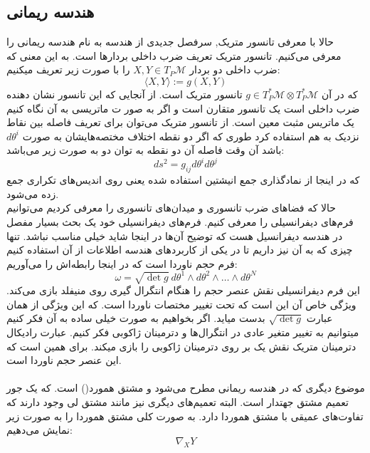 \subsection{هندسه ریمانی}
حالا با معرفی تانسور متریک, سرفصل جدیدی از هندسه به نام هندسه ریمانی را معرفی می‌کنیم. تانسور متریک تعریف ضرب داخلی بردارها است. به این معنی که ضرب داخلی دو بردار $X,Y\in T_P\mathcal{M}$ را با صورت زیر تعریف میکنیم:
\begin{equation}
    \langle X,Y\rangle :=g(X,Y)
\end{equation}
که در آن $g\in T_P^*\mathcal{M}\otimes T_P^*\mathcal{M}$ تانسور متریک است. از آنجایی که این تانسور نشان دهنده ضرب داخلی است یک تانسور متقارن است و اگر به صور ت ماتریسی به آن نگاه کنیم یک ماتریس مثبت معین است. از تانسور متریک می‌توان برای تعریف فاصله بین نقاط نزدیک به هم استفاده کرد طوری که اگر دو نقطه اختلاف مختصه‌هایشان به صورت $d\theta^i$ باشد آن وقت فاصله آن دو نقطه به توان دو به صورت زیر می‌باشد:
\begin{equation}
    ds^2=g_{ij}d\theta^id\theta^j
\end{equation}
که در اینجا از نمادگذاری جمع انیشتین استفاده شده یعنی روی اندیس‌های تکراری جمع زده می‌شود.\\
حالا که فضاهای ضرب تانسوری و میدان‌های تانسوری را معرفی کردیم می‌توانیم فرم‌های دیفرانسیلی را معرفی کنیم. فرم‌های دیفرانسیلی خود یک بحث بسیار مفصل در هندسه دیفرانسیل هست که توضیح آن‌ها در اینجا شاید خیلی مناسب نباشد. تنها چیزی که به آن نیز داریم تا در یکی از کاربردهای هندسه اطلاعات از آن استفاده کنیم فرم حجم ناوردا است که در اینجا رابطه‌اش را می‌آوریم:
\begin{equation}
    \omega=\sqrt{\det g}\ d\theta^1\wedge d\theta^2\wedge \dots \wedge d\theta^N
\end{equation}
این فرم دیفرانسیلی نقش عنصر حجم را هنگام انتگرال گیری روی منیفلد بازی می‌کند. ویژگی خاص آن این است که تحت تغییر مختصات ناوردا است. که این ویژگی از همان عبارت $\sqrt{\det g}$ بدست میاید. اگر بخواهیم به صورت خیلی ساده به آن فکر کنیم میتوانیم به تغییر متغیر عادی در انتگرال‌ها و دترمینان ژاکوبی فکر کنیم. عبارت رادیکال دترمینان متریک نقش یک بر روی دترمینان ژاکوبی را بازی میکند. برای همین است که این عنصر حجم ناوردا است.\\
\\
موضوع دیگری که در هندسه ریمانی مطرح می‌شود  و مشتق همورد() است. که یک جور تعمیم مشتق جهتدار است. البته تعمیم‌های دیگری نیز مانند مشتق لی وجود دارند که تفاوت‌های عمیقی با مشتق هموردا دارد. به صورت کلی مشتق هموردا را به صورت زیر نمایش می‌دهیم:
\begin{equation}
    \nabla_XY
\end{equation}
